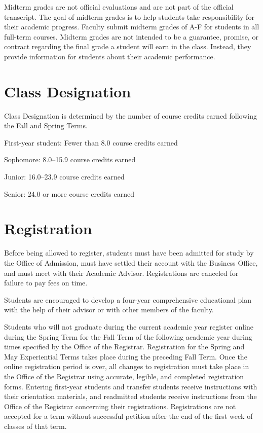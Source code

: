 \documentclass[
  letterpaper,
]{scrbook}
\begin{document}
Midterm grades are not official evaluations and are not part of the
official transcript. The goal of midterm grades is to help students take
responsibility for their academic progress. Faculty submit midterm
grades of A-F for students in all full-term courses. Midterm grades are
not intended to be a guarantee, promise, or contract regarding the final
grade a student will earn in the class. Instead, they provide
information for students about their academic performance.

\section{Class Designation}\label{class-designation}

Class Designation is determined by the number of course credits earned
following the Fall and Spring Terms.

First-year student: Fewer than 8.0 course credits earned

Sophomore: 8.0--15.9 course credits earned

Junior: 16.0--23.9 course credits earned

Senior: 24.0 or more course credits earned

\section{Registration}\label{registration}

Before being allowed to register, students must have been admitted for
study by the Office of Admission, must have settled their account with
the Business Office, and must meet with their Academic Advisor.
Registrations are canceled for failure to pay fees on time.

Students are encouraged to develop a four-year comprehensive educational
plan with the help of their advisor or with other members of the
faculty.

Students who will not graduate during the current academic year register
online during the Spring Term for the Fall Term of the following
academic year during times specified by the Office of the Registrar.
Registration for the Spring and May Experiential Terms takes place
during the preceding Fall Term. Once the online registration period is
over, all changes to registration must take place in the Office of the
Registrar using accurate, legible, and completed registration forms.
Entering first-year students and transfer students receive instructions
with their orientation materials, and readmitted students receive
instructions from the Office of the Registrar concerning their
registrations. Registrations are not accepted for a term without
successful petition after the end of the first week of classes of that
term.
\end{document}
